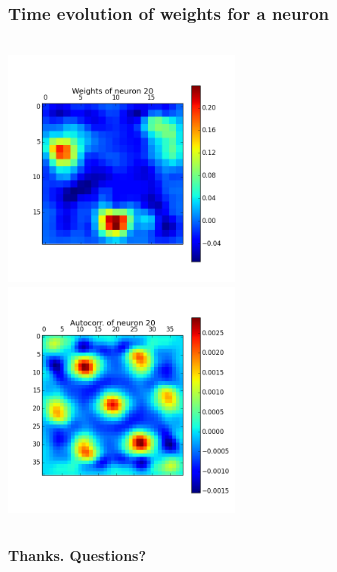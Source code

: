 \begin{frame}
\frametitle{Time evolution of weights for a neuron}
\begin{columns}[t]
\centering
\includegraphics[width=6cm,height=6cm]{neurons/neuron_w_20.png}\\
\centering
\includegraphics[width=6cm,height=6cm]{neurons/neuron_a_20.png}\\
\end{columns}
\end{frame}

\begin{frame}[c]
\begin{center}
{\huge \textbf{Thanks. Questions?}}
\end{center}
\end{frame}
